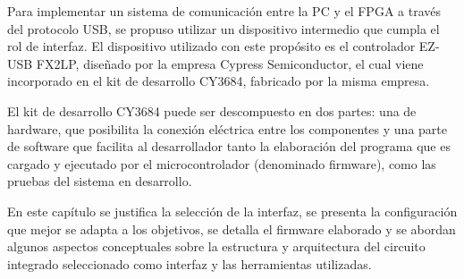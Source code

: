 Para implementar un sistema de comunicación entre la PC y el FPGA a través del protocolo USB, se propuso utilizar un dispositivo intermedio que cumpla el rol de interfaz. El dispositivo utilizado con este propósito es el controlador EZ-USB FX2LP, diseñado por la empresa Cypress Semiconductor, el cual viene incorporado en el kit de desarrollo CY3684, fabricado por la misma empresa.

El kit de desarrollo CY3684 puede ser descompuesto en dos partes: una de hardware, que posibilita la conexión eléctrica entre los componentes y una parte de software que facilita al desarrollador tanto la elaboración del programa que es cargado y ejecutado por el microcontrolador (denominado firmware), como las pruebas del sistema en desarrollo.

En este capítulo se justifica la selección de la interfaz, se presenta la configuración que mejor se adapta a los objetivos, se detalla el firmware elaborado y se abordan algunos aspectos conceptuales sobre la estructura y arquitectura del circuito integrado seleccionado como interfaz y las herramientas utilizadas.%



